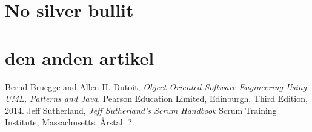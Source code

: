 \documentclass[12pt]{article}   %
\begin{document}
\section{No silver bullit}
\section{ den anden artikel}


\begin{thebibliography}{9}
		Bernd Bruegge and Allen H. Dutoit,
		\emph{Object-Oriented Software Engineering Using UML, Patterns
		and Java}.
		Pearson Education Limited, Edinburgh,
		Third Edition,
		2014.
		Jeff Sutherland,
		\emph{Jeff Sutherland's Scrum Handbook}
		Scrum Training Institute, Massachusetts,
		Årstal: ?.
\end{thebibliography}
\end{document}
